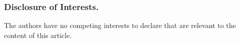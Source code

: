 \documentclass{llncs}
\begin{document}
\subsubsection*{Disclosure of Interests.}
The authors have no competing interests to declare
that are relevant to the content of this article.

\printbibliography
\end{document}
